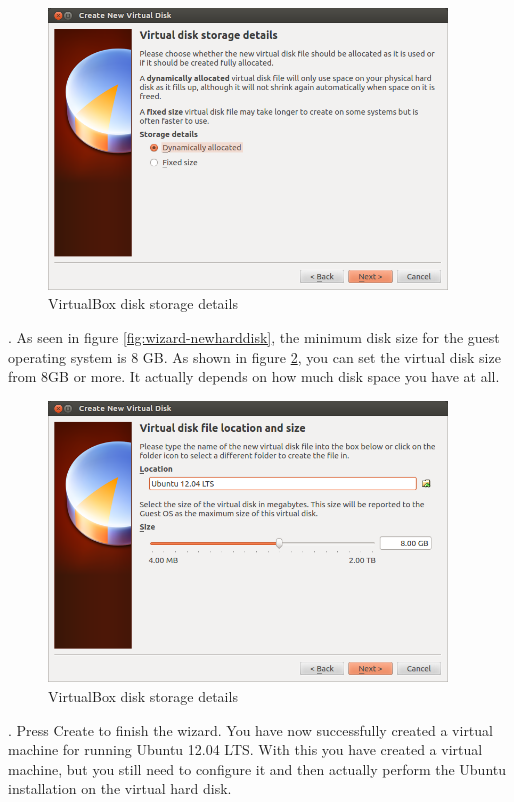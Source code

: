\begin{figure}[!h]	
	\centering
	\includegraphics[width=300pt]{./images/installation/virtualbox/wizard-dynamicsize.png}
	\caption{VirtualBox disk storage details}	
	\label{fig:wizard-dynamicsize}	
\end{figure}

\newpage
\par {}. As seen in figure \ref{fig:wizard-newharddisk}, the minimum disk size for the guest operating system is 8 GB. As shown in figure \ref{fig:wizard-sizelocation}, you can set the virtual disk size from 8GB or more.  It actually depends on how much disk space you have at all.  \\

\begin{figure}[!h]	
	\centering
	\includegraphics[width=300pt]{./images/installation/virtualbox/wizard-sizelocation.png}
	\caption{VirtualBox disk storage details}	
	\label{fig:wizard-sizelocation}	
\end{figure}

\par {}. Press Create to finish the wizard. You have now successfully created a virtual machine for running Ubuntu 12.04 LTS. With this you have created a virtual machine, but you still need to configure it and then actually perform the Ubuntu installation on the virtual hard disk.\\

